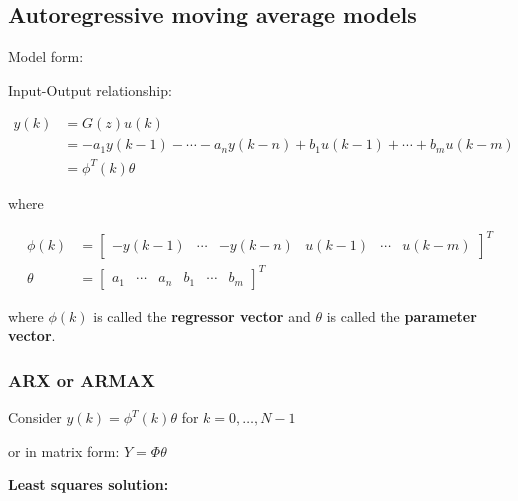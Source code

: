 \documentclass[10pt,a4paper]{scrartcl}
\begin{document}
\begin{multicols*}{2}
\subsection{Autoregressive moving average models}

Model form:


Input-Output relationship:

\begin{align*}
y(k)&=G(z)u(k)\\
&=-a_1y(k-1)-\cdots-a_ny(k-n)+b_1u(k-1)+\cdots+b_mu(k-m)\\
&=\phi^T(k)\theta
\end{align*}

where 

\begin{align*}
\phi(k)&=\begin{bmatrix}
-y(k-1)&\cdots&-y(k-n)&u(k-1)&\cdots&u(k-m)
\end{bmatrix}^T\\
\theta&=\begin{bmatrix}
a_1&\cdots&a_n&b_1&\cdots&b_m
\end{bmatrix}^T
\end{align*}

where $\phi(k)$ is called the \textbf{regressor vector} and $\theta$ is called the \textbf{parameter vector}.

\subsubsection{ARX or ARMAX}

Consider $y(k)=\phi^T(k)\theta$ for $k=0,\ldots, N-1$


or in matrix form: $Y = \Phi\theta$

\textbf{Least squares solution:}



\end{multicols*}
\end{document}
